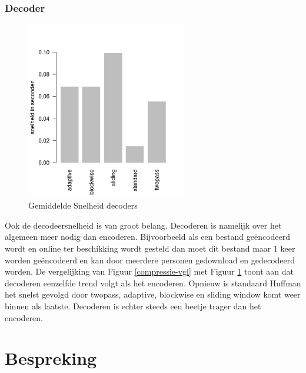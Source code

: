 \documentclass[twoside,twocolumn]{article}
\begin{document}
        \subsubsection{Decoder}
            \begin{figure}[H]
                \begin{center}
                 \includegraphics[width=7cm]{images/decodeer-snelheid-tekst.png}    
                \end{center}
                \caption{Gemiddelde Snelheid decoders}
                \label{decoder}
            \end{figure}
        Ook de decodeersnelheid is van groot belang. Decoderen is namelijk over het algemeen meer nodig dan encoderen. Bijvoorbeeld als een bestand geëncodeerd wordt en online ter beschikking wordt gesteld dan moet dit bestand maar 1 keer worden geëncodeerd en kan door meerdere personen gedownload en gedecodeerd worden.
        De vergelijking van Figuur \ref{compressie-vgl} met Figuur \ref{decoder} toont aan dat decoderen eenzelfde trend volgt als het encoderen. Opnieuw is standaard Huffman het snelst gevolgd door twopass, adaptive, blockwise en sliding window komt weer binnen als laatste.
    Decoderen is echter steeds een beetje trager dan het encoderen.
        

\section{Bespreking} 
\end{document}
